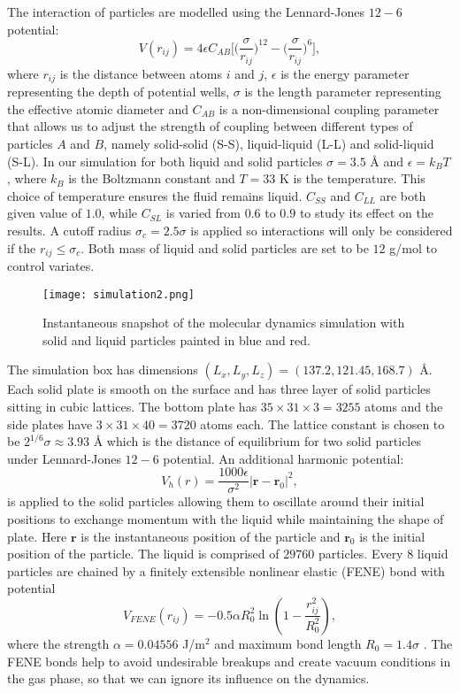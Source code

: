 \documentclass[
reprint,
 amsmath,amssymb,
 aps,
url
]{revtex4-1}
\begin{document}
The interaction of particles are modelled using the Lennard-Jones $12-6$ potential:
\begin{equation}
	V(r_{ij}) = 4\epsilon C_{AB}\bigg[\big(\frac{\sigma}{r_{ij}}\big)^{12} - \big(\frac{\sigma}{r_{ij}}\big)^6\bigg],
\end{equation}
where $r_{ij}$ is the distance between atoms $i$ and $j$, $\epsilon$ is the energy parameter representing the depth of potential wells, $\sigma$ is the length parameter representing the effective atomic diameter and $C_{AB}$ is a non-dimensional coupling parameter that allows us to adjust the strength of coupling between different types of particles $A$ and $B$, namely solid-solid (S-S), liquid-liquid (L-L) and solid-liquid (S-L). In our simulation for both liquid and solid particles $\sigma = 3.5$ \si{\angstrom} and $\epsilon = k_B T$, where $k_B$ is the Boltzmann constant and $T=33$ K is the temperature. This choice of temperature ensures the fluid remains liquid. $C_{SS}$ and $C_{LL}$ are both given value of $1.0$, while $C_{SL}$ is varied from $0.6$ to $0.9$ to study its effect on the results. A cutoff radius $\sigma_c = 2.5\sigma$ is applied so interactions will only be considered if the $r_{ij}\leq \sigma_c$. Both mass of liquid and solid particles are set to be $12$ g/mol to control variates.

\begin{figure}
	\texttt{[image: simulation2.png]}
	\caption{\label{fig:simulation2}Instantaneous snapshot of the  molecular dynamics simulation with solid and liquid particles painted in blue and red.}
\end{figure}

The simulation box has dimensions $(L_x,L_y,L_z) = (137.2,121.45,168.7)$ \si{\angstrom}. Each solid plate is smooth on the surface and has three layer of solid particles sitting in cubic lattices. The bottom plate has $35\times 31\times 3=3255$ atoms and the side plates have $3\times 31 \times 40=3720$ atoms each. The lattice constant is chosen to be $2^{1/6} \sigma\approx 3.93$ \si{\angstrom} which is the distance of equilibrium for two solid particles under Lennard-Jones $12-6$ potential. An additional harmonic potential:
\begin{equation}
	V_h(r) = \frac{1000\epsilon}{\sigma^2}|\mathbf{r}-\mathbf{r}_0|^2,
\end{equation} 
is applied to the solid particles allowing them to oscillate around their initial positions to exchange momentum with the liquid while maintaining the shape of plate. Here $\mathbf{r}$ is the instantaneous position of the particle and $\mathbf{r}_0$ is the initial position of the particle. The liquid is comprised of $29760$ particles. Every $8$ liquid particles are chained by a finitely extensible nonlinear elastic (FENE) bond with potential
\begin{equation}
	V_{\textit{FENE}}(r_{ij}) = -0.5\alpha R_0^2 \ln(1-\frac{r_{ij}^2}{R_0^2}),
\end{equation}
where the strength $\alpha = 0.04556$ J/m$^2$ and maximum bond length $R_0 = 1.4\sigma$ \cite{fernandez-toledano_contact-line_2019}. The FENE bonds help to avoid undesirable breakups and create vacuum conditions in the gas phase, so that we can ignore its influence on the dynamics.
\end{document}
